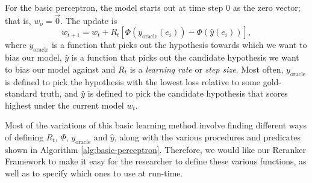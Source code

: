 \documentclass[a4paper]{article}
\begin{document}
For the basic perceptron, the model starts out at time step 0 as the
zero vector; that is, $w_{o}=\vec{0}.$ The update is 
\begin{equation}
w_{t+1}=w_{t}+R_{t}\left[\Phi\left(y_{\mathrm{oracle}}\left(e_{i}\right)\right)-\Phi\left(\hat{y}\left(e_{i}\right)\right)\right],\label{eq:perceptron-update}
\end{equation}
 where $y_{\mathrm{oracle}}$ is a function that picks out the hypothesis
towards which we want to bias our model, $\hat{y}$ is a function
that picks out the candidate hypothesis we want to bias our model
against and $R_{t}$ is a \emph{learning rate} or \emph{step size}.
Most often, $y_{\mathrm{oracle}}$ is defined to pick the hypothesis
with the lowest loss relative to some gold-standard truth, and $\hat{y}$
is defined to pick the candidate hypothesis that scores highest under
the current model $w_{t}$.

\begin{comment}
\subsection{Flexibility without sacrifice}
\end{comment}

Most of the variations of this basic learning method involve finding
different ways of defining $R_{t}$, $\Phi$, $y_{\mathrm{oracle}}$
and $\hat{y}$, along with the various procedures and predicates shown
in Algorithm \ref{alg:basic-perceptron}. Therefore, we would like
our Reranker Framework to make it easy for the researcher to define
these various functions, as well as to specify which ones to use at
run-time.
\end{document}
